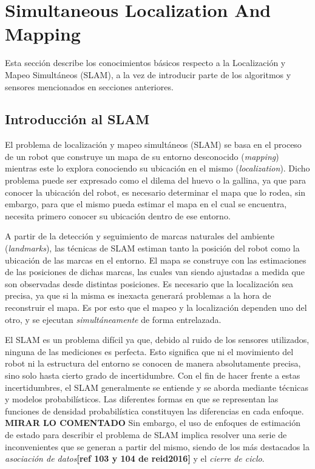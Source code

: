 
\section{Simultaneous Localization And Mapping}
Esta sección describe los conocimientos básicos respecto a la Localización y Mapeo Simultáneos (SLAM), a la vez de introducir parte de los algoritmos y sensores mencionados en secciones anteriores.

\subsection{Introducción al SLAM}
El problema de localización y mapeo simultáneos (SLAM) se basa en el proceso de un robot que construye un mapa de su entorno desconocido (\textit{mapping}) mientras este lo explora conociendo su ubicación en el mismo (\textit{localization}). Dicho problema puede ser expresado como el dilema del huevo o la gallina, ya que para conocer la ubicación del robot, es necesario determinar el mapa que lo rodea, sin embargo, para que el mismo pueda estimar el mapa en el cual se encuentra, necesita primero conocer su ubicación dentro de ese entorno. 

A partir de la detección y seguimiento de marcas naturales del ambiente (\textit{landmarks}), las técnicas de SLAM  estiman  tanto  la  posición  del  robot  como  la  ubicación  de las marcas en el entorno. El mapa se construye con las estimaciones de las posiciones  de  dichas  marcas,  las  cuales  van  siendo ajustadas  a  medida  que  son observadas desde distintas posiciones. Es necesario que la localización sea precisa, ya que si la misma es inexacta generará problemas a la hora de reconstruir el mapa. Es por esto que el mapeo y la localización dependen uno del otro, y se ejecutan \textit{simultáneamente} de forma entrelazada.

El SLAM es un problema difícil ya que, debido al ruido de los sensores utilizados, ninguna de las mediciones es perfecta. Esto significa que ni el movimiento del robot ni la estructura del entorno se conocen de manera absolutamente precisa, sino solo hasta cierto grado de incertidumbre. Con el fin de hacer frente a estas incertidumbres, el SLAM generalmente se entiende y se aborda mediante técnicas y modelos probabilísticos. Las diferentes formas en que se representan las funciones de densidad probabilística constituyen las diferencias en cada enfoque. 
\textbf{MIRAR LO COMENTADO}
Sin embargo, el uso de enfoques de estimación de estado para describir el problema de SLAM implica resolver una serie de inconvenientes que se generan a partir del mismo, siendo de los más destacados la \textit{asociación de datos}\textbf{[ref 103 y 104 de reid2016]} y el \textit{cierre de ciclo}.

